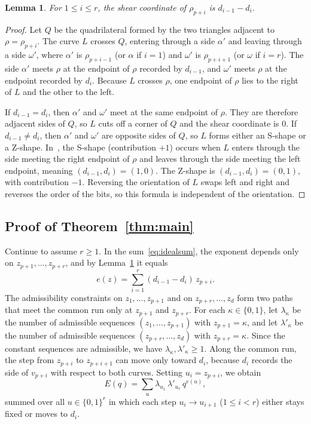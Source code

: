 \documentclass[11pt]{amsart}
\newtheorem{lemma}[theorem]{Lemma}
\theoremstyle{remark}
\numberwithin{equation}{section}
\begin{document}
\begin{lemma}\label{lem:shear}
For $1\le i\le r$, the shear coordinate of $\rho_{p+i}$ is $d_{i-1}-d_i$.
\end{lemma}

\begin{proof}
Let $Q$ be the quadrilateral formed by the two triangles adjacent to
$\rho=\rho_{p+i}$. The curve $L$ crosses $Q$, entering through a side $\alpha'$
and leaving through a side $\omega'$, where $\alpha'$ is $\rho_{p+i-1}$ (or
$\alpha$ if $i=1$) and $\omega'$ is $\rho_{p+i+1}$ (or $\omega$ if $i=r$). The
side $\alpha'$ meets $\rho$ at the endpoint of $\rho$ recorded by $d_{i-1}$,
and $\omega'$ meets $\rho$ at the endpoint recorded by $d_i$. Because $L$
crosses $\rho$, one endpoint of $\rho$ lies to the right of $L$ and the other
to the left.

If $d_{i-1}=d_i$, then $\alpha'$ and $\omega'$ meet at the same endpoint of
$\rho$. They are therefore adjacent sides of $Q$, so $L$ cuts off a corner of
$Q$ and the shear coordinate is $0$. If $d_{i-1}\ne d_i$, then $\alpha'$ and
$\omega'$ are opposite sides of $Q$, so $L$ forms either an S-shape or a
Z-shape. In~\cite[Figure~3]{KLL}, the S-shape (contribution $+1$) occurs when
$L$ enters through the side meeting the right endpoint of $\rho$ and leaves
through the side meeting the left endpoint, meaning $(d_{i-1},d_i)=(1,0)$. The
Z-shape is $(d_{i-1},d_i)=(0,1)$, with contribution $-1$. Reversing the
orientation of $L$ swaps left and right and reverses the order of the bits, so
this formula is independent of the orientation.
\end{proof}

\subsection{Proof of Theorem~\ref{thm:main}}
Continue to assume $r\ge1$. In the sum~\eqref{eq:idealsum}, the exponent
depends only on $z_{p+1},\dots,z_{p+r}$, and by Lemma~\ref{lem:shear} it equals
\[
e(z)=\sum_{i=1}^r(d_{i-1}-d_i)\,z_{p+i}.
\]
The admissibility constraints on $z_1,\dots,z_{p+1}$ and on
$z_{p+r},\dots,z_d$ form two paths that meet the common run only at $z_{p+1}$
and $z_{p+r}$. For each $\kappa\in\{0,1\}$, let $\lambda_\kappa$ be the number
of admissible sequences $(z_1,\dots,z_{p+1})$ with $z_{p+1}=\kappa$, and let
$\lambda'_\kappa$ be the number of admissible sequences $(z_{p+r},\dots,z_d)$
with $z_{p+r}=\kappa$. Since the constant sequences are admissible, we have
$\lambda_\kappa,\lambda'_\kappa\ge1$. Along the common run, the step from
$z_{p+i}$ to $z_{p+i+1}$ can move only toward $d_i$, because $d_i$ records the
side of $v_{p+i}$ with respect to both curves. Setting $u_i=z_{p+i}$, we obtain
\begin{equation}\label{eq:split}
E(q)=\sum_{u}\lambda_{u_1}\,\lambda'_{u_r}\,q^{e(u)},
\end{equation}
summed over all $u\in\{0,1\}^r$ in which each step $u_i\to u_{i+1}$
($1\le i<r$) either stays fixed or moves to $d_i$.
\end{document}
